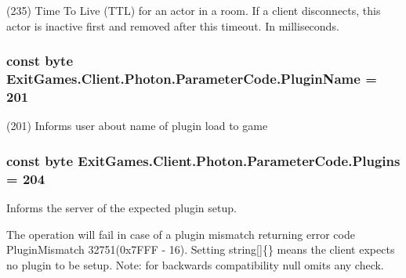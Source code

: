 (235) Time To Live (T\+TL) for an \textquotesingle{}actor\textquotesingle{} in a room. If a client disconnects, this actor is inactive first and removed after this timeout. In milliseconds.

\subsubsection[{\texorpdfstring{Plugin\+Name}{PluginName}}]{\setlength{\rightskip}{0pt plus 5cm}const byte Exit\+Games.\+Client.\+Photon.\+Parameter\+Code.\+Plugin\+Name = 201}\hypertarget{class_exit_games_1_1_client_1_1_photon_1_1_parameter_code_a347bdffcd091fd5db0ac8eb8612cd7ad}{}\label{class_exit_games_1_1_client_1_1_photon_1_1_parameter_code_a347bdffcd091fd5db0ac8eb8612cd7ad}


(201) Informs user about name of plugin load to game

\subsubsection[{\texorpdfstring{Plugins}{Plugins}}]{\setlength{\rightskip}{0pt plus 5cm}const byte Exit\+Games.\+Client.\+Photon.\+Parameter\+Code.\+Plugins = 204}\hypertarget{class_exit_games_1_1_client_1_1_photon_1_1_parameter_code_a3d221707fef5b7a3f98507d7376d008f}{}\label{class_exit_games_1_1_client_1_1_photon_1_1_parameter_code_a3d221707fef5b7a3f98507d7376d008f}


Informs the server of the expected plugin setup. 

The operation will fail in case of a plugin mismatch returning error code Plugin\+Mismatch 32751(0x7\+F\+FF -\/ 16). Setting string\mbox{[}\mbox{]}\{\} means the client expects no plugin to be setup. Note\+: for backwards compatibility null omits any check. 
